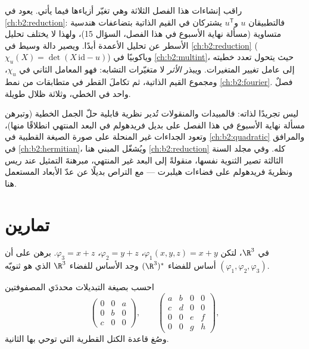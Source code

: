 \begin{remark}\label{rem:b2:linalg:perspectives}
راقب إنشاءات هذا الفصل الثلاثة وهي تغيّر أزياءها فيما
يأتي. يعود \emph{} في
\cref{ch:b2:reduction}: فالتطبيقان $u$ و$u^{\mathsf T}$ يشتركان في
القيم الذاتية بتضاعفات هندسية متساوية (مسألة نهاية الأسبوع
في هذا الفصل، السؤال 15)، ولهذا لا يختلف تحليل الأسطر عن
تحليل الأعمدة أبدًا. ويصير \emph{} دالة وسيط في
\cref{ch:b2:reduction} ($\chi_u(X) = \det(X\,\mathrm{id} - u)$) وياكوبيًا في
\cref{ch:b2:multint}، حيث يتحول تعدد خطيته إلى عامل
تغيير المتغيرات. ويبذر \emph{الأثر} لا متغيّرات
التشابه: فهو المعامل الثاني في
$\chi_u$، ومجموع القيم الذاتية، ثم تكاملَ
القطر في متطابقات من نمط \cref{ch:b2:fourier}. فصلٌ واحد
في  الخطي، وثلاثة ظلال طويلة.
\end{remark}

\begin{remark}
ليس  تجريدًا لذاته: فالمبيدات والمنقولات تُدير
نظرية قابلية حلّ الجمل الخطية (وتبرهن مسألة نهاية الأسبوع في
هذا الفصل على بديل فريدهولم في البعد المنتهي انطلاقًا منها)،
وتعود الجداءات غير المنحلة على صورة الصيغة القطبية في
\cref{ch:b2:quadratic} والمرافق في
\cref{ch:b2:hermitian}، ويُشغّل  المبني هنا
\cref{ch:b2:reduction} كله. وفي مجلد السنة الثالثة تصير الثنوية
نفسها، منقولةً إلى البعد غير المنتهي، مبرهنةَ التمثيل عند
ريس ونظريةَ فريدهولم على فضاءات هيلبرت --- مع التراص بديلًا
عن عدّ الأبعاد المستعمل هنا.
\end{remark}

\section{تمارين}

\begin{exercise}[$\star$]\label{exo:b2:linalg:1}
في $\R^3$، لتكن $\varphi_1(x,y,z) = x + y$، $\varphi_2 = y + z$،
$\varphi_3 = x + z$. برهن على أن $(\varphi_1, \varphi_2, \varphi_3)$
أساس للفضاء $(\R^3)^*$ وجد الأساس للفضاء $\R^3$ الذي هو ثنويّه.
\end{exercise}

\begin{exercise}[$\star$]\label{exo:b2:linalg:2}
احسب بصيغة التبديلات محددَي المصفوفتين
\[
\begin{pmatrix} 0 & 0 & a\\ 0 & b & 0\\ c & 0 & 0 \end{pmatrix},
\qquad
\begin{pmatrix}
a & b & 0 & 0\\
c & d & 0 & 0\\
0 & 0 & e & f\\
0 & 0 & g & h
\end{pmatrix},
\]
وصُغ قاعدة الكتل القطرية التي توحي بها الثانية.
\end{exercise}

